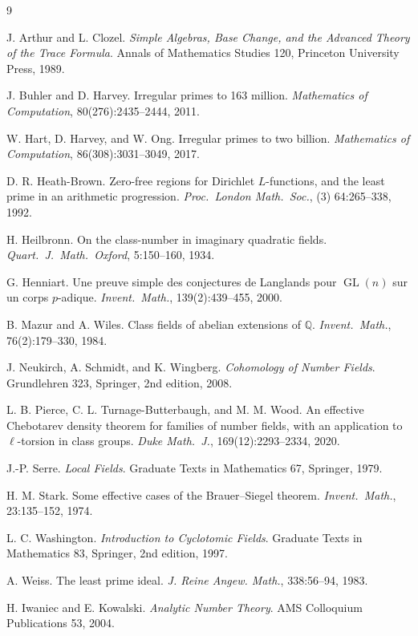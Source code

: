 \documentclass[11pt]{article}
\newcommand{\Q}{\mathbb Q}
\newcommand{\GL}{\operatorname{GL}}
\begin{document}

\begin{thebibliography}{9}

J. Arthur and L. Clozel.
\newblock \emph{Simple Algebras, Base Change, and the Advanced Theory of the Trace Formula}.
\newblock Annals of Mathematics Studies 120, Princeton University Press, 1989.

J. Buhler and D. Harvey.
\newblock Irregular primes to 163 million.
\newblock \emph{Mathematics of Computation}, 80(276):2435--2444, 2011.

W. Hart, D. Harvey, and W. Ong.
\newblock Irregular primes to two billion.
\newblock \emph{Mathematics of Computation}, 86(308):3031--3049, 2017.

D. R. Heath-Brown.
\newblock Zero-free regions for Dirichlet \(L\)-functions, and the least prime in an arithmetic progression.
\newblock \emph{Proc.\ London Math.\ Soc.}, (3) 64:265--338, 1992.

H. Heilbronn.
\newblock On the class-number in imaginary quadratic fields.
\newblock \emph{Quart.\ J.\ Math.\ Oxford}, 5:150--160, 1934.

G. Henniart.
\newblock Une preuve simple des conjectures de Langlands pour \(\GL(n)\) sur un corps \(p\)-adique.
\newblock \emph{Invent.\ Math.}, 139(2):439--455, 2000.

B. Mazur and A. Wiles.
\newblock Class fields of abelian extensions of \(\Q\).
\newblock \emph{Invent.\ Math.}, 76(2):179--330, 1984.

J. Neukirch, A. Schmidt, and K. Wingberg.
\newblock \emph{Cohomology of Number Fields}.
\newblock Grundlehren 323, Springer, 2nd edition, 2008.

L. B. Pierce, C. L. Turnage-Butterbaugh, and M. M. Wood.
\newblock An effective Chebotarev density theorem for families of number fields, with an application to \(\ell\)-torsion in class groups.
\newblock \emph{Duke Math.\ J.}, 169(12):2293--2334, 2020.

J.-P. Serre.
\newblock \emph{Local Fields}.
\newblock Graduate Texts in Mathematics 67, Springer, 1979.

H. M. Stark.
\newblock Some effective cases of the Brauer--Siegel theorem.
\newblock \emph{Invent.\ Math.}, 23:135--152, 1974.

L. C. Washington.
\newblock \emph{Introduction to Cyclotomic Fields}.
\newblock Graduate Texts in Mathematics 83, Springer, 2nd edition, 1997.

A. Weiss.
\newblock The least prime ideal.
\newblock \emph{J. Reine Angew. Math.}, 338:56--94, 1983.

H. Iwaniec and E. Kowalski.
\newblock \emph{Analytic Number Theory}.
\newblock AMS Colloquium Publications 53, 2004.

\end{thebibliography}
\end{document}
